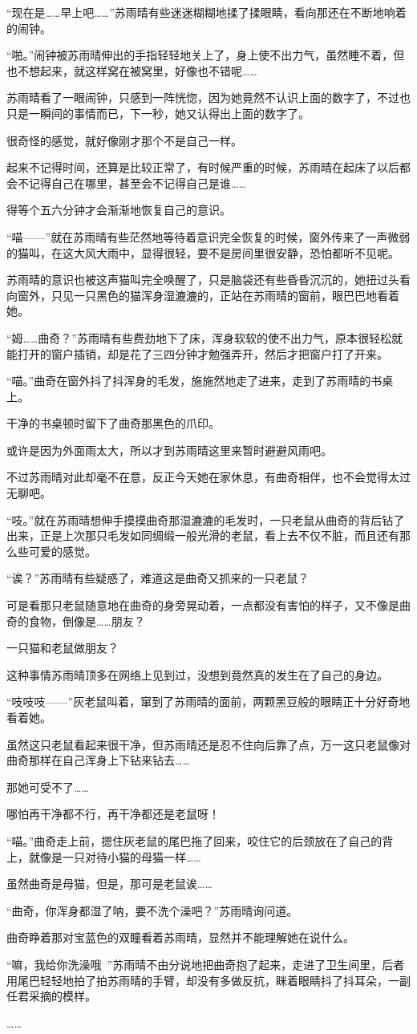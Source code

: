 “现在是……早上吧……”苏雨晴有些迷迷糊糊地揉了揉眼睛，看向那还在不断地响着的闹钟。

“啪。”闹钟被苏雨晴伸出的手指轻轻地关上了，身上使不出力气，虽然睡不着，但也不想起来，就这样窝在被窝里，好像也不错呢……

苏雨晴看了一眼闹钟，只感到一阵恍惚，因为她竟然不认识上面的数字了，不过也只是一瞬间的事情而已，下一秒，她又认得出上面的数字了。

很奇怪的感觉，就好像刚才那个不是自己一样。

起来不记得时间，还算是比较正常了，有时候严重的时候，苏雨晴在起床了以后都会不记得自己在哪里，甚至会不记得自己是谁……

得等个五六分钟才会渐渐地恢复自己的意识。

“喵——”就在苏雨晴有些茫然地等待着意识完全恢复的时候，窗外传来了一声微弱的猫叫，在这大风大雨中，显得很轻，要不是房间里很安静，恐怕都听不见呢。

苏雨晴的意识也被这声猫叫完全唤醒了，只是脑袋还有些昏昏沉沉的，她扭过头看向窗外，只见一只黑色的猫浑身湿漉漉的，正站在苏雨晴的窗前，眼巴巴地看着她。

“姆……曲奇？”苏雨晴有些费劲地下了床，浑身软软的使不出力气，原本很轻松就能打开的窗户插销，却是花了三四分钟才勉强弄开，然后才把窗户打了开来。

“喵。”曲奇在窗外抖了抖浑身的毛发，施施然地走了进来，走到了苏雨晴的书桌上。

干净的书桌顿时留下了曲奇那黑色的爪印。

或许是因为外面雨太大，所以才到苏雨晴这里来暂时避避风雨吧。

不过苏雨晴对此却毫不在意，反正今天她在家休息，有曲奇相伴，也不会觉得太过无聊吧。

“吱。”就在苏雨晴想伸手摸摸曲奇那湿漉漉的毛发时，一只老鼠从曲奇的背后钻了出来，正是上次那只毛发如同绸缎一般光滑的老鼠，看上去不仅不脏，而且还有那么些可爱的感觉。

“诶？”苏雨晴有些疑惑了，难道这是曲奇又抓来的一只老鼠？

可是看那只老鼠随意地在曲奇的身旁晃动着，一点都没有害怕的样子，又不像是曲奇的食物，倒像是……朋友？

一只猫和老鼠做朋友？

这种事情苏雨晴顶多在网络上见到过，没想到竟然真的发生在了自己的身边。

“吱吱吱——”灰老鼠叫着，窜到了苏雨晴的面前，两颗黑豆般的眼睛正十分好奇地看着她。

虽然这只老鼠看起来很干净，但苏雨晴还是忍不住向后靠了点，万一这只老鼠像对曲奇那样在自己浑身上下钻来钻去……

那她可受不了……

哪怕再干净都不行，再干净都还是老鼠呀！

“喵。”曲奇走上前，摁住灰老鼠的尾巴拖了回来，咬住它的后颈放在了自己的背上，就像是一只对待小猫的母猫一样……

虽然曲奇是母猫，但是，那可是老鼠诶……

“曲奇，你浑身都湿了呐，要不洗个澡吧？”苏雨晴询问道。

曲奇睁着那对宝蓝色的双瞳看着苏雨晴，显然并不能理解她在说什么。

“嘛，我给你洗澡哦~”苏雨晴不由分说地把曲奇抱了起来，走进了卫生间里，后者用尾巴轻轻地拍了拍苏雨晴的手臂，却没有多做反抗，眯着眼睛抖了抖耳朵，一副任君采摘的模样。

……
